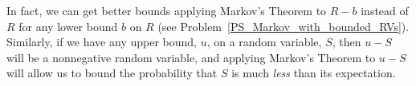 In fact, we can get better bounds applying Markov's Theorem to $R-b$
instead of $R$ for any lower bound $b$ on $R$ (see
Problem~\ref{PS_Markov_with_bounded_RVs}).  Similarly, if we have any
upper bound, $u$, on a random variable, $S$, then $u-S$ will be a
nonnegative random variable, and applying Markov's Theorem to $u-S$
will allow us to bound the probability that $S$ is much \emph{less}
than its expectation.

\iffalse
Suppose we know that $R \geq \ell$, then can we do better?
Let $T=R-\ell$.  Note that $T \geq 0$.  So, we can use Markov's
Theorem on $T$, to say that 
\begin{eqnarray*}
\pr{R  \geq x }   & = &   \pr{T \geq x -\ell} 
  \leq 
  \frac{\expect{T}}{x -\ell} 
  =   \frac{\expect{R - \ell}}{x - \ell}
  =   \frac{\expect{R} - \ell}{x - \ell} \\
\end{eqnarray*}
This gives a somewhat better bound on the probability that
$R$ goes crazy!  
\fi

